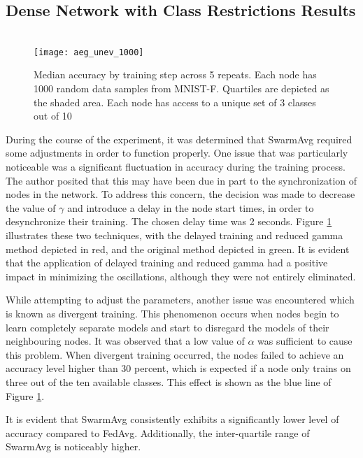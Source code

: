 \subsection{Dense Network with Class Restrictions Results}

\begin{figure}[H] 
	 \\
	\texttt{[image: aeg\_unev\_1000]}
	\caption{Median accuracy by training step across 5 repeats. Each node has 1000 random data samples from MNIST-F. Quartiles are depicted as the shaded area. Each node has access to a unique set of 3 classes out of 10}
	\label{aeg7}
\end{figure}

During the course of the experiment, it was determined that SwarmAvg required some adjustments in order to function properly. One issue that was particularly noticeable was a significant fluctuation in accuracy during the training process. The author posited that this may have been due in part to the synchronization of nodes in the network. To address this concern, the decision was made to decrease the value of $\gamma$ and introduce a delay in the node start times, in order to desynchronize their training. The chosen delay time was 2 seconds. Figure \ref{aeg7} illustrates these two techniques, with the delayed training and reduced gamma method depicted in red, and the original method depicted in green. It is evident that the application of delayed training and reduced gamma had a positive impact in minimizing the oscillations, although they were not entirely eliminated.

While attempting to adjust the parameters, another issue was encountered which is known as divergent training. This phenomenon occurs when nodes begin to learn completely separate models and start to disregard the models of their neighbouring nodes. It was observed that a low value of $\alpha$ was sufficient to cause this problem. When divergent training occurred, the nodes failed to achieve an accuracy level higher than 30 percent, which is expected if a node only trains on three out of the ten available classes. This effect is shown as the blue line of Figure \ref{aeg7}.

It is evident that SwarmAvg consistently exhibits a significantly lower level of accuracy compared to FedAvg. Additionally, the inter-quartile range of SwarmAvg is noticeably higher.

